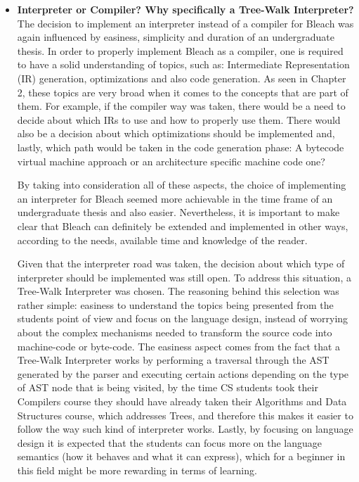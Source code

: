 \begin{itemize}
\begin{itemize}
        \item \textbf{Interpreter or Compiler? Why specifically a Tree-Walk Interpreter?} The decision to implement an interpreter instead of a compiler for Bleach was again influenced by easiness, simplicity and duration of an undergraduate thesis. In order to properly implement Bleach as a compiler, one is required to have a solid understanding of topics, such as: Intermediate Representation (IR) generation, optimizations and also code generation. As seen in Chapter 2, these topics are very broad when it comes to the concepts that are part of them. For example, if the compiler way was taken, there would be a need to decide about which IRs to use and how to properly use them. There would also be a decision about which optimizations should be implemented and, lastly, which path would be taken in the code generation phase: A bytecode virtual machine approach or an architecture specific machine code one?

        By taking into consideration all of these aspects, the choice of implementing an interpreter for Bleach seemed more achievable in the time frame of an undergraduate thesis and also easier. Nevertheless, it is important to make clear that Bleach can definitely be extended and implemented in other ways, according to the needs, available time and knowledge of the reader.

        Given that the interpreter road was taken, the decision about which type of interpreter should be implemented was still open. To address this situation, a Tree-Walk Interpreter was chosen. The reasoning behind this selection was rather simple: easiness to understand the topics being presented from the students point of view and focus on the language design, instead of worrying about the complex mechanisms needed to transform the source code into machine-code or byte-code. The easiness aspect comes from the fact that a Tree-Walk Interpreter works by performing a traversal through the AST generated by the parser and executing certain actions depending on the type of AST node that is being visited, by the time CS students took their Compilers course they should have already taken their Algorithms and Data Structures course, which addresses Trees, and therefore this makes it easier to follow the way such kind of interpreter works. Lastly, by focusing on language design it is expected that the students can focus more on the language semantics (how it behaves and what it can express), which for a beginner in this field might be more rewarding in terms of learning.

        
    \end{itemize}
\end{itemize}


